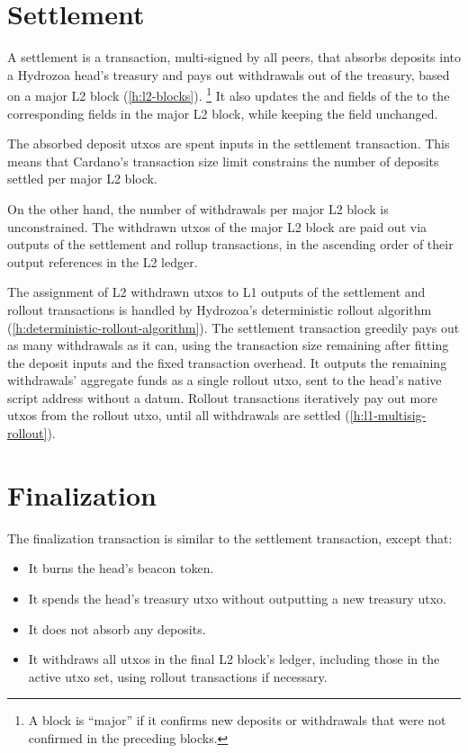 \documentclass[../hydrozoa.tex]{subfiles}
\begin{document}
\section{Settlement}%
\label{h:l1-multisig-settlement}%

A settlement is a transaction, multi-signed by all peers, that absorbs deposits into a Hydrozoa head's treasury and pays out withdrawals out of the treasury, based on a major L2 block (\cref{h:l2-blocks}).%
\footnote{A block is ``major'' if it confirms new deposits or withdrawals that were not confirmed in the preceding blocks.}
It also updates the  and  fields of the  to the corresponding fields in the major L2 block, while keeping the  field unchanged.

The absorbed deposit utxos are spent inputs in the settlement transaction.
This means that Cardano's transaction size limit constrains the number of deposits settled per major L2 block.

On the other hand, the number of withdrawals per major L2 block is unconstrained.
The withdrawn utxos of the major L2 block are paid out via outputs of the settlement and rollup transactions, in the ascending order of their output references in the L2 ledger.

The assignment of L2 withdrawn utxos to L1 outputs of the settlement and rollout transactions is handled by Hydrozoa's deterministic rollout algorithm (\cref{h:deterministic-rollout-algorithm}).
The settlement transaction greedily pays out as many withdrawals as it can, using the transaction size remaining after fitting the deposit inputs and the fixed transaction overhead.
It outputs the remaining withdrawals' aggregate funds as a single rollout utxo, sent to the head's native script address without a datum.
Rollout transactions iteratively pay out more utxos from the rollout utxo, until all withdrawals are settled (\cref{h:l1-multisig-rollout}).

\section{Finalization}%
\label{h:l1-multisig-finalization}%

The finalization transaction is similar to the settlement transaction, except that:
\begin{itemize}
  \item It burns the head's beacon token.
  \item It spends the head's treasury utxo without outputting a new treasury utxo.
  \item It does not absorb any deposits.
  \item It withdraws all utxos in the final L2 block's ledger, including those in the active utxo set, using rollout transactions if necessary.
\end{itemize}
\end{document}
